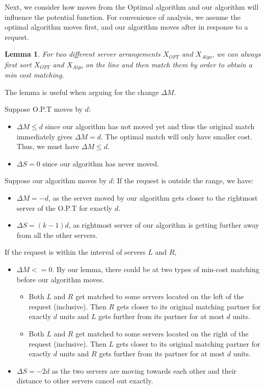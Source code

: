 \documentclass[11pt]{article}
\newtheorem{lemma}[fact]{Lemma}
\begin{document}
Next, we consider how moves from the Optimal algorithm and our algorithm will influence the potential function. For convenience of analysis, we assume the optimal algorithm moves first, and our algorithm moves after in response to a request. \newline

\begin{lemma}
For two different server arrangements $X_{OPT}$ and $X_{{Algo}}$, we can always first sort $X_{OPT}$ and $X_{Algo}$ on the line and then match them by order to obtain a min cost matching.
\end{lemma}

The lemma is useful when arguing for the change $\Delta{M}$.

Suppose O.P.T moves by $d$:
\begin{itemize}
    \item $\Delta{M} \leq d$ since our algorithm has not moved yet and thus the original match immediately gives $\Delta{M} = d$. The optimal match will only have smaller cost. Thus, we must have $\Delta{M} \leq d$.
    \item $\Delta{S} = 0$ since our algorithm has never moved.
\end{itemize}

Suppose our algorithm moves by $d$: \newline
If the request is outside the range, we have: \newline
\begin{itemize}
    \item $\Delta{M} = -d$, as the server moved by our algorithm gets closer to the rightmost server of the O.P.T for exactly $d$.
    \item $\Delta{S} = (k-1)d$, as rightmost server of our algorithm is getting further away from all the other servers.
\end{itemize}
If the request is within the interval of servers $L$ and $R$,
\begin{itemize}
    \item $\Delta{M} <= 0$. By our lemma, there could be at two types of min-cost matching before our algorithm moves. 
    \begin{itemize}
        \item Both $L$ and $R$ get matched to some servers located on the left of the request (inclusive). Then $R$ gets closer to its original matching partner for exactly $d$ units and $L$ gets further from its partner for at most $d$ units.
        \item Both $L$ and $R$ get matched to some servers located on the right of the request (inclusive). Then $L$ gets closer to its original matching partner for exactly $d$ units and $R$ gets further from its partner for at most $d$ units.
    \end{itemize}
    \item $\Delta{S} = -2d$ as the two servers are moving towards each other and their distance to other servers cancel out exactly.
\end{itemize} \newline
\end{document}
